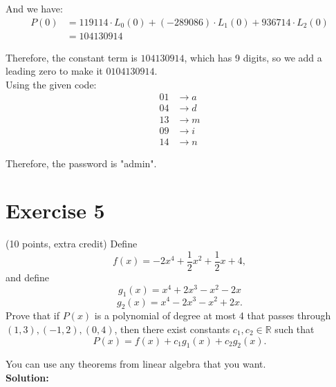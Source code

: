 \documentclass{article}
\begin{document}
And we have:
\begin{align*}
P(0) &= 119114 \cdot L_0(0) + (-289086) \cdot L_1(0) + 936714 \cdot L_2(0) \\
&= 104130914
\end{align*}

Therefore, the constant term is $104130914$, which has 9 digits, so we add a leading zero to make it $0104130914$. \\

Using the given code:
\begin{align*}
01 &\rightarrow a\\
04 &\rightarrow d\\
13 &\rightarrow m\\
09 &\rightarrow i\\
14 &\rightarrow n
\end{align*}

Therefore, the password is "admin".

\newpage

\section*{Exercise 5}
(10 points, extra credit) Define
\[
f(x) = -2x^4 + \frac{1}{2}x^2 + \frac{1}{2}x + 4,
\]
and define
\[
g_1(x) = x^4 + 2x^3 - x^2 - 2x
\]
\[
g_2(x) = x^4 - 2x^3 - x^2 + 2x.
\]
Prove that if $P(x)$ is a polynomial of degree at most 4 that passes through $(1,3), (-1,2), (0,4)$, then there exist constants $c_1, c_2 \in \mathbb{R}$ such that
\[
P(x) = f(x) + c_1 g_1(x) + c_2 g_2(x).
\]

You can use any theorems from linear algebra that you want. \\

\textbf{Solution:} \\
\end{document}
